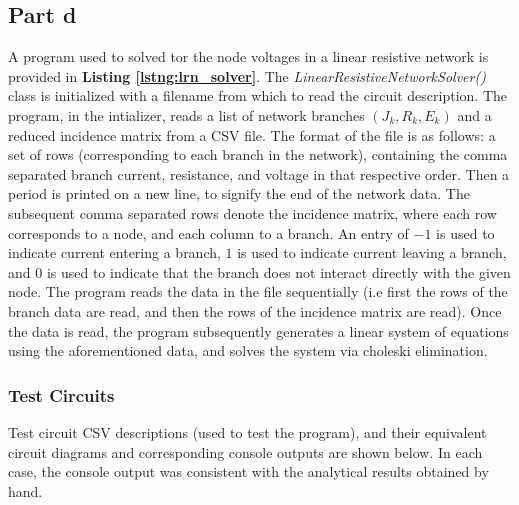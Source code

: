 \documentclass[11pt]{amsart}
\begin{document}
\subsection*{Part d}
A program used to solved tor the node voltages in a linear resistive network is provided in \textbf{Listing \ref{lstng:lrn_solver}}. The \textit{LinearResistiveNetworkSolver()} class is initialized with a filename from which to read the circuit description. The program, in the intializer, reads a list of network branches $(J_k, R_k, E_k)$ and a reduced incidence matrix from a CSV file. The format of the file is as follows: a set of rows (corresponding to each branch in the network), containing the comma separated branch current, resistance, and voltage in that respective order. Then a period is printed on a new line, to signify the end of the network data. The subsequent comma separated rows denote the incidence matrix, where each row corresponds to a node, and each column to a branch. An entry of $-1$ is used to indicate current entering a branch, $1$ is used to indicate current leaving a branch, and $0$ is used to indicate that the branch does not interact directly with the given node. The program reads the data in the file sequentially (i.e first the rows of the branch data are read, and then the rows of the incidence matrix are read). Once the data is read, the program subsequently generates a linear system of equations using the aforementioned data, and solves the system via choleski elimination.

\subsubsection*{Test Circuits} Test circuit CSV descriptions (used to test the program), and their equivalent circuit diagrams and corresponding console outputs are shown below. In each case, the console output was consistent with the analytical results obtained by hand.\\[0.1in]
\pagebreak
\end{document}
